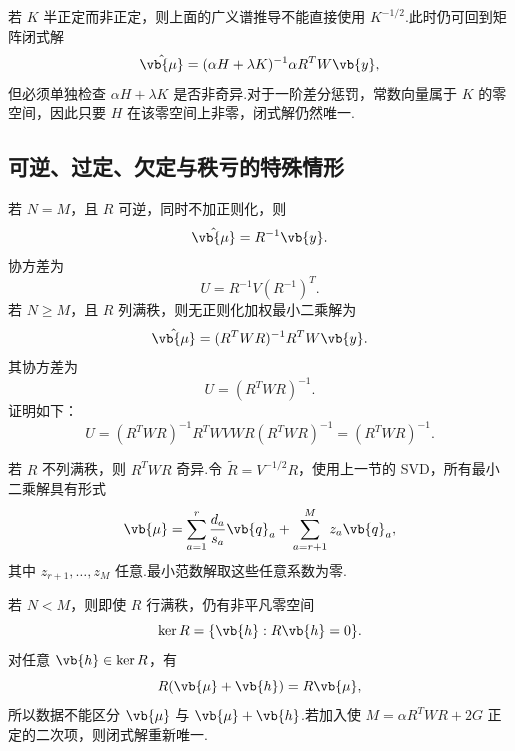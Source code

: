 \begin{notes}
	若 \(K\) 半正定而非正定，则上面的广义谱推导不能直接使用 \(K^{-1/2}\).此时仍可回到矩阵闭式解
	\begin{equation*}
		\hat{\vb{\mu}}
		=(\alpha H+\lambda K)^{-1}\alpha R^TW\vb{y},
	\end{equation*}
	但必须单独检查 \(\alpha H+\lambda K\) 是否非奇异.对于一阶差分惩罚，常数向量属于 \(K\) 的零空间，因此只要 \(H\) 在该零空间上非零，闭式解仍然唯一.
\end{notes}

\subsection{可逆、过定、欠定与秩亏的特殊情形}

若 \(N=M\)，且 \(R\) 可逆，同时不加正则化，则
\begin{equation*}
	\hat{\vb{\mu}}=R^{-1}\vb{y}.
\end{equation*}
协方差为
\begin{equation*}
	U=R^{-1}V(R^{-1})^T.
\end{equation*}
若 \(N\geq M\)，且 \(R\) 列满秩，则无正则化加权最小二乘解为
\begin{equation*}
	\hat{\vb{\mu}}
	=(R^TWR)^{-1}R^TW\vb{y}.
\end{equation*}
其协方差为
\begin{equation*}
	U=(R^TWR)^{-1}.
\end{equation*}
证明如下：
\begin{equation*}
	U
	=(R^TWR)^{-1}R^TWVWR(R^TWR)^{-1}
	=(R^TWR)^{-1}.
\end{equation*}

若 \(R\) 不列满秩，则 \(R^TWR\) 奇异.令 \(\tilde{R}=V^{-1/2}R\)，使用上一节的 SVD，所有最小二乘解具有形式
\begin{equation*}
	\vb{\mu}
	=\sum_{a=1}^{r}\frac{d_a}{s_a}\vb{q}_a
	+\sum_{a=r+1}^{M}z_a\vb{q}_a,
\end{equation*}
其中 \(z_{r+1},\ldots,z_M\) 任意.最小范数解取这些任意系数为零.

若 \(N<M\)，则即使 \(R\) 行满秩，仍有非平凡零空间
\begin{equation*}
	\ker R=\{\vb{h}:R\vb{h}=0\}.
\end{equation*}
对任意 \(\vb{h}\in\ker R\)，有
\begin{equation*}
	R(\vb{\mu}+\vb{h})=R\vb{\mu},
\end{equation*}
所以数据不能区分 \(\vb{\mu}\) 与 \(\vb{\mu}+\vb{h}\).若加入使 \(M=\alpha R^TWR+2G\) 正定的二次项，则闭式解重新唯一.


